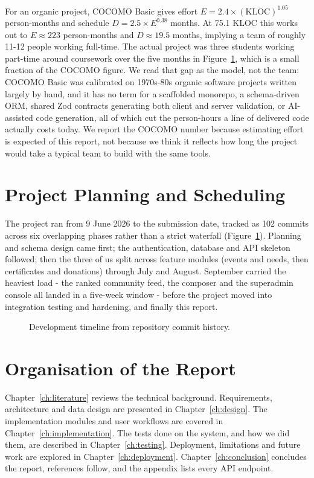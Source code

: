 For an organic project, COCOMO Basic gives effort $E = 2.4 \times (\text{KLOC})^{1.05}$ person-months and schedule $D = 2.5 \times E^{0.38}$ months. At 75.1 KLOC this works out to $E \approx 223$ person-months and $D \approx 19.5$ months, implying a team of roughly 11-12 people working full-time. The actual project was three students working part-time around coursework over the five months in Figure~\ref{fig:timeline}, which is a small fraction of the COCOMO figure. We read that gap as the model, not the team: COCOMO Basic was calibrated on 1970s-80s organic software projects written largely by hand, and it has no term for a scaffolded monorepo, a schema-driven ORM, shared Zod contracts generating both client and server validation, or AI-assisted code generation, all of which cut the person-hours a line of delivered code actually costs today. We report the COCOMO number because estimating effort is expected of this report, not because we think it reflects how long the project would take a typical team to build with the same tools.

\section{Project Planning and Scheduling}
\label{sec:planning}
The project ran from 9 June 2026 to the submission date, tracked as 102 commits across six overlapping phases rather than a strict waterfall (Figure~\ref{fig:timeline}). Planning and schema design came first; the authentication, database and API skeleton followed; then the three of us split across feature modules (events and needs, then certificates and donations) through July and August. September carried the heaviest load - the ranked community feed, the composer and the superadmin console all landed in a five-week window - before the project moved into integration testing and hardening, and finally this report.

\begin{figure}[H]
    \centering
    \caption{Development timeline from repository commit history.}
    \label{fig:timeline}
\end{figure}

\section{Organisation of the Report}
Chapter~\ref{ch:literature} reviews the technical background. Requirements, architecture and data design are presented in Chapter~\ref{ch:design}. The implementation modules and user workflows are covered in Chapter~\ref{ch:implementation}. The tests done on the system, and how we did them, are described in Chapter~\ref{ch:testing}. Deployment, limitations and future work are explored in Chapter~\ref{ch:deployment}. Chapter~\ref{ch:conclusion} concludes the report, references follow, and the appendix lists every API endpoint.

